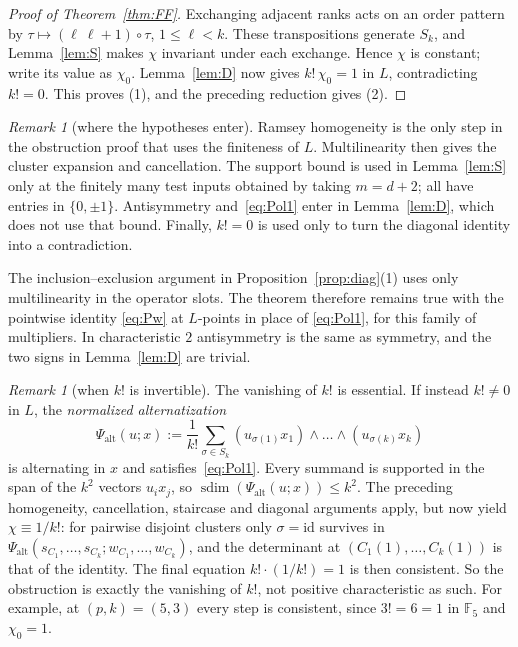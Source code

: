\documentclass[11pt]{amsart}
\theoremstyle{definition}
\theoremstyle{remark}
\newtheorem{remark}[theorem]{Remark}
\numberwithin{equation}{section}
\newcommand{\F}{\mathbb F}
\newcommand{\id}{\mathrm{id}}
\newcommand{\sdim}{\operatorname{sdim}}
\theoremstyle{plain}
\theoremstyle{definition}
\theoremstyle{plain}
\begin{document}
\begin{proof}[Proof of Theorem~\ref{thm:FF}]
Exchanging adjacent ranks acts on an order pattern by
$\tau\mapsto(\ell\ \ell{+}1)\circ\tau$, $1\le\ell<k$. These transpositions generate $S_k$, and Lemma~\ref{lem:S}
makes $\chi$ invariant under each exchange. Hence $\chi$ is constant; write its value as $\chi_0$.
Lemma~\ref{lem:D} now gives $k!\,\chi_0=1$ in $L$, contradicting $k!=0$. This proves (1), and the preceding reduction
gives (2).
\end{proof}

\begin{remark}[where the hypotheses enter]\label{rem:FFhyp}
Ramsey homogeneity is the only step in the obstruction proof that uses the finiteness of $L$.
Multilinearity then gives the cluster expansion and cancellation. The support bound is used in Lemma~\ref{lem:S}
only at the finitely many test inputs obtained by taking $m=d+2$; all have entries in $\{0,\pm1\}$.
Antisymmetry and~\eqref{eq:Pol1} enter in Lemma~\ref{lem:D}, which does not use that bound. Finally, $k!=0$ is used only
to turn the diagonal identity into a contradiction.

The inclusion--exclusion argument in Proposition~\ref{prop:diag}(1) uses only multilinearity in the
operator slots. The theorem therefore remains true with the pointwise identity \eqref{eq:Pw} at $L$\nobreakdash-points in place of
\eqref{eq:Pol1}, for this family of multipliers. In characteristic $2$ antisymmetry is the same as symmetry, and the two signs in
Lemma~\ref{lem:D} are trivial.
\end{remark}

\begin{remark}[when $k!$ is invertible]\label{rem:FFunit}
The vanishing of $k!$ is essential. If instead $k!\ne0$ in $L$, the \emph{normalized alternatization}
\[
\Psi_{\mathrm{alt}}(u;x):=\frac1{k!}\sum_{\sigma\in S_k}(u_{\sigma(1)}x_1)\wedge\dots\wedge(u_{\sigma(k)}x_k)
\]
is alternating in $x$ and satisfies~\eqref{eq:Pol1}. Every summand is supported in the span of the $k^2$ vectors
$u_ix_j$, so $\sdim(\Psi_{\mathrm{alt}}(u;x))\le k^2$. The preceding homogeneity, cancellation, staircase and diagonal
arguments apply, but now yield $\chi\equiv1/k!$: for pairwise disjoint clusters only $\sigma=\id$
survives in $\Psi_{\mathrm{alt}}(s_{C_1},\dots,s_{C_k};w_{C_1},\dots,w_{C_k})$, and the determinant at
$(C_1(1),\dots,C_k(1))$ is that of the identity. The final equation $k!\cdot(1/k!)=1$ is then consistent. So the
obstruction is exactly the vanishing of $k!$, not positive characteristic as such. For example, at $(p,k)=(5,3)$ every
step is consistent, since $3!=6=1$ in $\F_5$ and $\chi_0=1$.
\end{remark}
\end{document}
